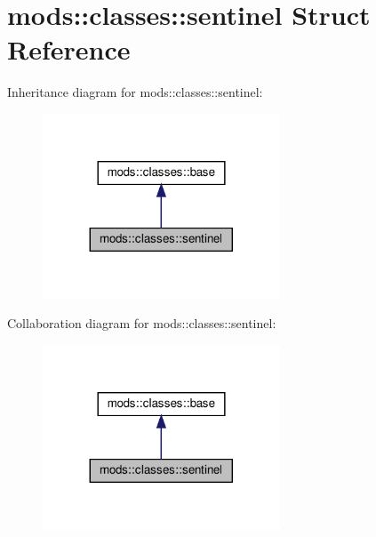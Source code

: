 \hypertarget{structmods_1_1classes_1_1sentinel}{}\section{mods\+:\+:classes\+:\+:sentinel Struct Reference}
\label{structmods_1_1classes_1_1sentinel}


Inheritance diagram for mods\+:\+:classes\+:\+:sentinel\+:\nopagebreak
\begin{figure}[H]
\begin{center}
\leavevmode
\includegraphics[width=200pt]{structmods_1_1classes_1_1sentinel__inherit__graph}
\end{center}
\end{figure}


Collaboration diagram for mods\+:\+:classes\+:\+:sentinel\+:\nopagebreak
\begin{figure}[H]
\begin{center}
\leavevmode
\includegraphics[width=200pt]{structmods_1_1classes_1_1sentinel__coll__graph}
\end{center}
\end{figure}
